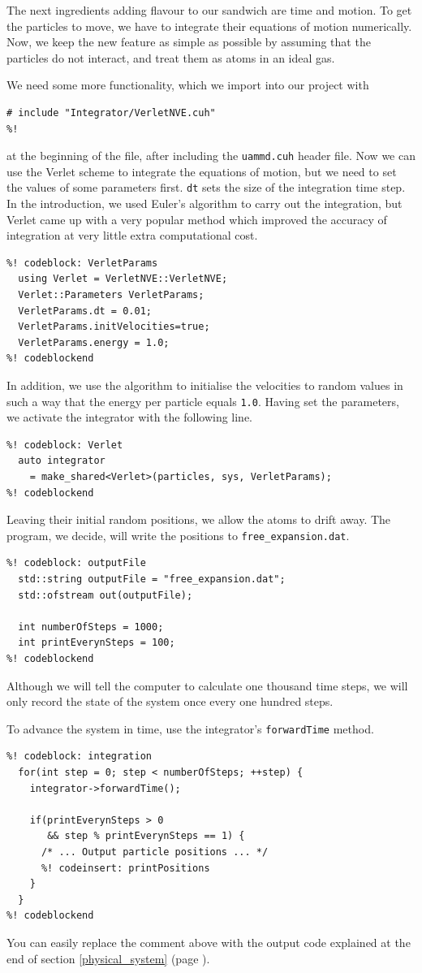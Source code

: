 The next ingredients adding flavour to our sandwich are time and motion. To get
the particles to move, we have to integrate their equations of motion
numerically. Now, we keep the new feature as simple as possible by assuming that
the particles do not interact, and treat them as atoms in an ideal gas.

We need some more functionality, which we import into our project with
\begin{lstlisting}
# include "Integrator/VerletNVE.cuh"
%!
\end{lstlisting}
at the beginning of the file, after including the \texttt{uammd.cuh} header 
file. Now we can use the Verlet scheme to integrate the equations of motion, but 
we need to set the values of some parameters first. \texttt{dt} sets the size of 
the integration time step. In the introduction, we used Euler's algorithm to 
carry out the integration, but Verlet came up with a very popular method which 
improved the accuracy of integration at very little extra computational cost.
\begin{lstlisting}
%! codeblock: VerletParams
  using Verlet = VerletNVE::VerletNVE;
  Verlet::Parameters VerletParams;
  VerletParams.dt = 0.01;
  VerletParams.initVelocities=true;
  VerletParams.energy = 1.0;
%! codeblockend
\end{lstlisting}
In addition, we use the algorithm to initialise the velocities to random values
in such a way that the energy per particle equals \texttt{1.0}. Having set the
parameters, we activate the integrator with the following line.
\begin{lstlisting}
%! codeblock: Verlet
  auto integrator
    = make_shared<Verlet>(particles, sys, VerletParams);
%! codeblockend
\end{lstlisting}

Leaving their initial random positions, we allow the atoms to drift away. The 
program, we decide, will write the positions to \texttt{free\_expansion.dat}.
\begin{lstlisting}
%! codeblock: outputFile
  std::string outputFile = "free_expansion.dat";
  std::ofstream out(outputFile);

  int numberOfSteps = 1000;
  int printEverynSteps = 100;
%! codeblockend
\end{lstlisting}
Although we will tell the computer to calculate one thousand time steps, we
will only record the state of the system once every one hundred steps. 

To advance the system in time, use the integrator's \texttt{forwardTime} method.
\begin{lstlisting}
%! codeblock: integration
  for(int step = 0; step < numberOfSteps; ++step) {
    integrator->forwardTime();

    if(printEverynSteps > 0
       && step % printEverynSteps == 1) {
      /* ... Output particle positions ... */
      %! codeinsert: printPositions
    }
  }
%! codeblockend
\end{lstlisting}
You can easily replace the comment above with the output code explained at the
end of section \ref{physical_system} (page \pageref{particlePositions}).

